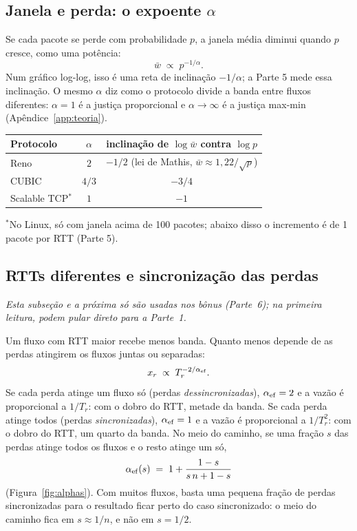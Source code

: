 \documentclass[11pt,a4paper]{article}
\begin{document}
\subsection{Janela e perda: o expoente \texorpdfstring{$\alpha$}{alfa}}

Se cada pacote se perde com probabilidade $p$, a janela média diminui quando $p$ cresce,
como uma potência:
\begin{equation}
\bar w\;\propto\;p^{-1/\alpha}.
\label{eq:alpha}
\end{equation}
Num gráfico log-log, isso é uma reta de inclinação $-1/\alpha$; a Parte 5 mede essa
inclinação. O mesmo $\alpha$ diz como o protocolo divide a banda entre fluxos
diferentes: $\alpha=1$ é a justiça proporcional e $\alpha\to\infty$ é a justiça max-min
(Apêndice~\ref{app:teoria}).

\begin{center}
\begin{tabular}{@{}lcc@{}}
\toprule
Protocolo & $\alpha$ & inclinação de $\log\bar w$ contra $\log p$\\
\midrule
Reno & $2$ & $-1/2$ (lei de Mathis, $\bar w\approx1{,}22/\sqrt p$)\\
CUBIC & $4/3$ & $-3/4$\\
Scalable TCP$^{*}$ & $1$ & $-1$\\
\bottomrule
\end{tabular}

\smallskip
{\footnotesize $^{*}$No Linux, só com janela acima de 100 pacotes; abaixo disso o
incremento é de 1 pacote por RTT (Parte 5).}
\end{center}

\subsection{RTTs diferentes e sincronização das perdas}

\emph{Esta subseção e a próxima só são usadas nos bônus (Parte~6); na primeira leitura,
podem pular direto para a Parte~1.}

Um fluxo com RTT maior recebe menos banda. Quanto menos depende de as perdas atingirem
os fluxos juntas ou separadas:
\begin{equation}
x_r\;\propto\;T_r^{-2/\alpha_{\rm ef}} .
\label{eq:rttbias}
\end{equation}
Se cada perda atinge um fluxo só (perdas \emph{dessincronizadas}), $\alpha_{\rm ef}=2$ e
a vazão é proporcional a $1/T_r$: com o dobro do RTT, metade da banda. Se cada perda
atinge todos (perdas \emph{sincronizadas}), $\alpha_{\rm ef}=1$ e a vazão é proporcional a
$1/T_r^2$: com o dobro do RTT, um quarto da banda. No meio do caminho, se uma fração $s$
das perdas atinge todos os fluxos e o resto atinge um só,
\begin{equation}
\alpha_{\rm ef}(s)\;=\;1+\frac{1-s}{s\,n+1-s}
\label{eq:interp}
\end{equation}
(Figura~\ref{fig:alphas}). Com muitos fluxos, basta uma pequena fração de perdas
sincronizadas para o resultado ficar perto do caso sincronizado: o meio do caminho fica
em $s\approx1/n$, e não em $s=1/2$.
\end{document}
